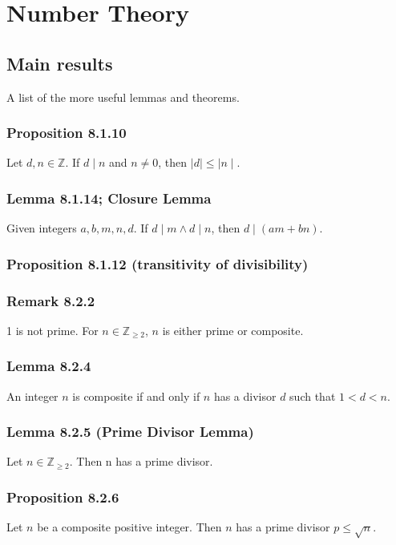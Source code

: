 \documentclass{article}
\begin{document}
\section{Number Theory}
\subsection{Main results}
A list of the more useful lemmas and theorems.
\subsubsection{Proposition 8.1.10}
Let $d, n\in \mathbb{Z}$. If $d\mid n$ and $n\neq 0$, then $\mid d \mid \leq \mid n \mid$.

\subsubsection{Lemma 8.1.14; Closure Lemma}
Given integers $a,b,m,n,d$. If $d\mid m \land d\mid n$, then $d\mid (am+bn)$. 

\subsubsection{Proposition 8.1.12 (transitivity of divisibility)}

\subsubsection{Remark 8.2.2}
1 is not prime.
For $n\in \mathbb{Z}_{\geq 2}$, $n$ is either prime or composite.

\subsubsection{Lemma 8.2.4}
An integer $n$ is composite if and only if $n$ has a divisor $d$ such that $1 < d < n$.

\subsubsection{Lemma 8.2.5 (Prime Divisor Lemma)} 
Let $n \in \mathbb{Z}_{\geq 2}$. Then n has a
prime divisor.

\subsubsection{Proposition 8.2.6}
Let $n$ be a composite positive integer. Then $n$ has a prime divisor $p\leq \sqrt{n}$.
\end{document}
